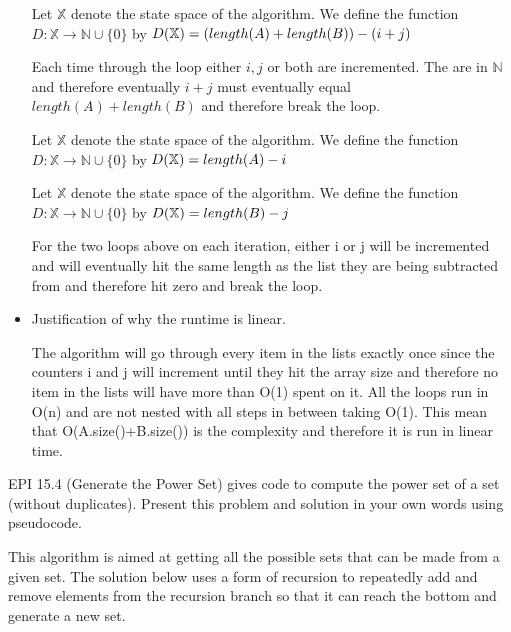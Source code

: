 \documentclass{article}
\newcommand{\N}{\mathbb{N}}
\begin{document}
\begin{itemize}
	 Let $\mathbb{X}$ denote the state space of the algorithm. We define the function $D \colon \mathbb{X} \to \N \cup \{0\}$ by $D( \mathbb{X}) = ( length(A) + length(B) )-(i + j)\newline $
    
    Each time through the loop either $i,j$ or both are incremented. The are in $\N$ and therefore eventually $i + j$ must eventually equal $ length(A) + length(B) $ and therefore break the loop.

    Let $\mathbb{X}$ denote the state space of the algorithm. We define the function $D \colon \mathbb{X} \to \N \cup \{0\}$ by $D( \mathbb{X}) =  length(A) - i\newline $

    Let $\mathbb{X}$ denote the state space of the algorithm. We define the function $D \colon \mathbb{X} \to \N \cup \{0\}$ by $D( \mathbb{X}) =  length(B) - j\newline$
    
    For the two loops above on each iteration, either i or j will be incremented and will eventually hit the same length as the list they are being subtracted from and therefore hit zero and break the loop.
    
   

    
    \item Justification of why the runtime is linear.
    
        The algorithm will go through every item in the lists exactly once since the counters i and j will increment until they hit the array size and therefore no item in the lists will have more than O(1) spent on it. All the loops run in O(n) and are not nested with all steps in between taking O(1). This mean that O(A.size()+B.size()) is the complexity and therefore it is run in linear time. 
    
\end{itemize}

\nextprob
EPI 15.4 (Generate the Power Set) gives code to compute the power set of a set
(without duplicates).  Present this problem and solution in your own words using
pseudocode.

This algorithm is aimed at getting all the possible sets that can be made from a given set. The solution below uses a form of recursion to repeatedly add and remove elements from the recursion branch so that it can reach the bottom and generate a new set.
\end{document}
